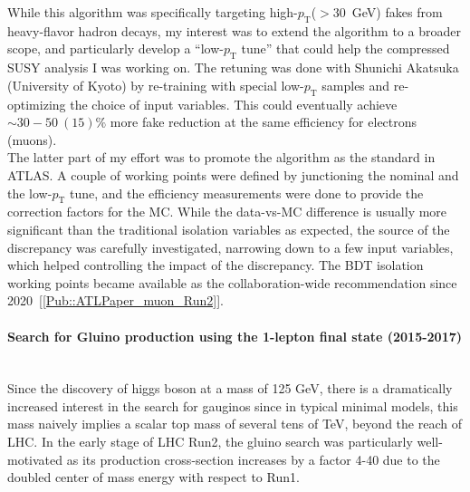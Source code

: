 \documentclass[12pt]{article}
\newcommand{\Subsubsection}[1]{\subsubsection*{#1}
\addcontentsline{toc}{subsubsection}{#1}}
\newcommand{\pt}{\ensuremath{p_{\text{T}}}\xspace}
\begin{document}
While this algorithm was specifically targeting high-\pt ($>30$~GeV) fakes from heavy-flavor hadron decays,
my interest was to extend the algorithm to a broader scope, and particularly develop a ``low-\pt tune'' that could help the compressed SUSY analysis I was working on.
The retuning was done with Shunichi Akatsuka (University of Kyoto) by re-training with special low-\pt samples and re-optimizing the choice of input variables.
This could eventually achieve $\sim 30-50~(15)\%$ more fake reduction at the same efficiency for electrons (muons). \\

The latter part of my effort was to promote the algorithm as the standard in ATLAS.
A couple of working points were defined by junctioning the nominal and the low-\pt tune, and the efficiency measurements were done to provide the correction factors for the MC.
While the data-vs-MC difference is usually more significant than the traditional isolation variables as expected, the source of the discrepancy was carefully investigated, narrowing down to a few input variables, which helped controlling the impact of the discrepancy.
The BDT isolation working points became available as the collaboration-wide recommendation since 2020~[\ref{Pub::ATLPaper_muon_Run2}].


\paragraph{Search for Gluino production using the 1-lepton final state (2015-2017)}  \phantom{k} \vspace{3mm} \\
Since the discovery of higgs boson at a mass of 125 GeV, there is a dramatically increased interest in the search for gauginos since in typical minimal models, this mass naively implies a scalar top mass of several tens of TeV, beyond the reach of LHC. In the early stage of LHC Run2, the gluino search was particularly well-motivated as its production cross-section increases by a factor 4-40 due to the doubled center of mass energy with respect to Run1. \\
\end{document}
